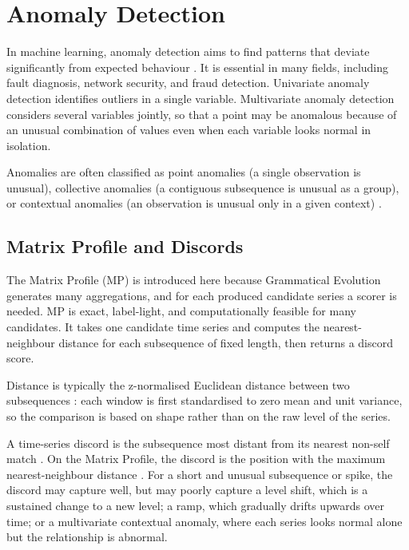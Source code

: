\section{Anomaly Detection}

In machine learning, anomaly detection aims to find patterns that deviate significantly from expected behaviour \parencite{chandola2009}.
It is essential in many fields, including fault diagnosis, network security, and fraud detection.
Univariate anomaly detection identifies outliers in a single variable.
Multivariate anomaly detection considers several variables jointly, so that a point may be anomalous because of an unusual combination of values even when each variable looks normal in isolation.

Anomalies are often classified as point anomalies (a single observation is unusual), collective anomalies (a contiguous subsequence is unusual as a group), or contextual anomalies (an observation is unusual only in a given context) \parencite{chandola2009}.

\subsection{Matrix Profile and Discords}

The Matrix Profile (\ac{MP}) is introduced here because Grammatical Evolution generates many aggregations, and for each produced candidate series a scorer is needed.
\ac{MP} is exact, label-light, and computationally feasible for many candidates.
It takes one candidate time series and computes the nearest-neighbour distance for each subsequence of fixed length, then returns a discord score.

Distance is typically the z-normalised Euclidean distance between two subsequences \parencite{yeh2017timeseriesjoins}: each window is first standardised to zero mean and unit variance, so the comparison is based on shape rather than on the raw level of the series.

A time-series discord is the subsequence most distant from its nearest non-self match \parencite{keogh2005hotsax}.
On the Matrix Profile, the discord is the position with the maximum nearest-neighbour distance \parencite{yeh2017timeseriesjoins}.
For a short and unusual subsequence or spike, the discord may capture well, but may poorly capture a level shift, which is a sustained change to a new level; a ramp, which gradually drifts upwards over time; or a multivariate contextual anomaly, where each series looks normal alone but the relationship is abnormal.

